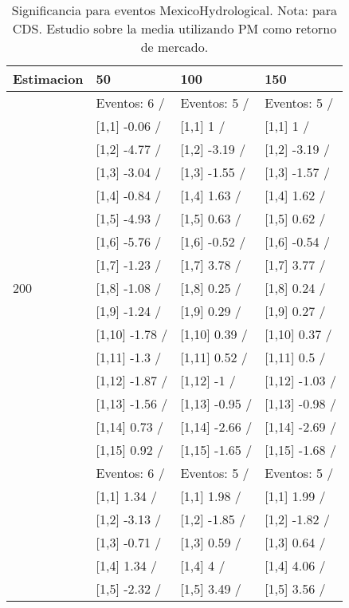 \begin{table}

\caption{Significancia para eventos MexicoHydrological. Nota: para CDS. Estudio sobre la media utilizando PM como retorno de mercado.}
\centering
\begin{tabular}[t]{llll}
\toprule
Estimacion & 50 & 100 & 150\\
\midrule
 & Eventos:  6 / & Eventos:  5 / & Eventos:  5 /\\
 & {}[1,1] -0.06  / & {}[1,1] 1  / & {}[1,1] 1  /\\
 & {}[1,2] -4.77  / & {}[1,2] -3.19  / & {}[1,2] -3.19  /\\
 & {}[1,3] -3.04  / & {}[1,3] -1.55  / & {}[1,3] -1.57  /\\
 & {}[1,4] -0.84  / & {}[1,4] 1.63  / & {}[1,4] 1.62  /\\
\addlinespace
 & {}[1,5] -4.93  / & {}[1,5] 0.63  / & {}[1,5] 0.62  /\\
 & {}[1,6] -5.76  / & {}[1,6] -0.52  / & {}[1,6] -0.54  /\\
 & {}[1,7] -1.23  / & {}[1,7] 3.78  / & {}[1,7] 3.77  /\\
200 & {}[1,8] -1.08  / & {}[1,8] 0.25  / & {}[1,8] 0.24  /\\
 & {}[1,9] -1.24  / & {}[1,9] 0.29  / & {}[1,9] 0.27  /\\
\addlinespace
 & {}[1,10] -1.78  / & {}[1,10] 0.39  / & {}[1,10] 0.37  /\\
 & {}[1,11] -1.3  / & {}[1,11] 0.52  / & {}[1,11] 0.5  /\\
 & {}[1,12] -1.87  / & {}[1,12] -1  / & {}[1,12] -1.03  /\\
 & {}[1,13] -1.56  / & {}[1,13] -0.95  / & {}[1,13] -0.98  /\\
 & {}[1,14] 0.73  / & {}[1,14] -2.66  / & {}[1,14] -2.69  /\\
\addlinespace
 & {}[1,15] 0.92  / & {}[1,15] -1.65  / & {}[1,15] -1.68  /\\
 & Eventos:  6 / & Eventos:  5 / & Eventos:  5 /\\
 & {}[1,1] 1.34  / & {}[1,1] 1.98  / & {}[1,1] 1.99  /\\
 & {}[1,2] -3.13  / & {}[1,2] -1.85  / & {}[1,2] -1.82  /\\
 & {}[1,3] -0.71  / & {}[1,3] 0.59  / & {}[1,3] 0.64  /\\
\addlinespace
 & {}[1,4] 1.34  / & {}[1,4] 4  / & {}[1,4] 4.06  /\\
 & {}[1,5] -2.32  / & {}[1,5] 3.49  / & {}[1,5] 3.56  /\\

\end{tabular}
\end{table}

